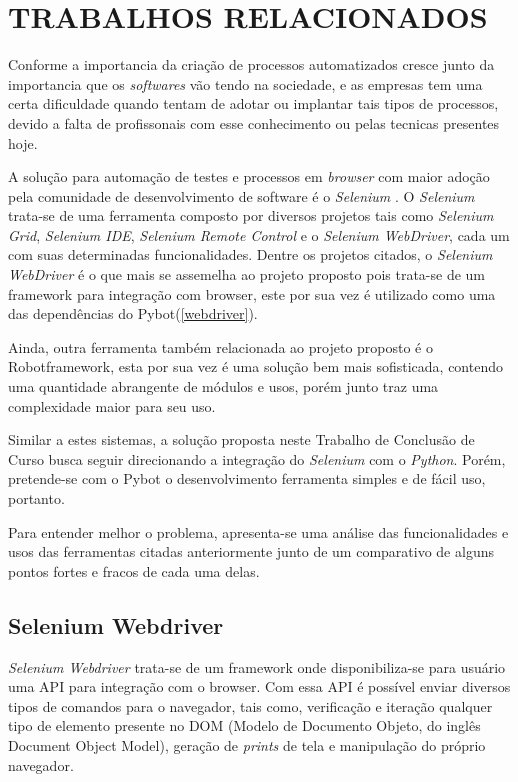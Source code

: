 %
%

\chapter{TRABALHOS RELACIONADOS}\label{chap:relacionados}

    Conforme \cite{dos2016estudo} a importancia da criação de processos automatizados cresce junto da importancia que os \emph{softwares} vão tendo na sociedade, e as empresas
    tem uma certa dificuldade quando tentam de adotar ou implantar tais tipos de processos, devido a falta de profissonais com esse conhecimento ou pelas tecnicas presentes hoje.

    A solução para automação de testes e processos em \textit{browser} com maior adoção pela comunidade de desenvolvimento de software é o \emph{Selenium} \cite{selenium}.
    O \emph{Selenium} trata-se de uma ferramenta composto por diversos projetos tais como \emph{Selenium Grid}, \emph{Selenium IDE}, \emph{Selenium Remote Control} e o \emph{Selenium WebDriver},
    cada um com suas determinadas funcionalidades. Dentre os projetos citados, o \emph{Selenium WebDriver} é o que mais se assemelha ao projeto proposto pois trata-se de um framework para
    integração com browser, este por sua vez é utilizado como uma das dependências do Pybot(\ref{webdriver}).

    Ainda, outra ferramenta também relacionada ao projeto proposto é o Robotframework, esta por sua vez é uma solução bem mais sofisticada, contendo uma quantidade abrangente de módulos
    e usos, porém junto traz uma complexidade maior para seu uso.

    Similar a estes sistemas, a solução proposta neste Trabalho de Conclusão de Curso busca seguir direcionando a integração do \emph{Selenium} com o \emph{Python}. Porém, pretende-se com o Pybot o
    desenvolvimento ferramenta simples e de fácil uso, portanto.

    Para entender melhor o problema, apresenta-se uma análise das funcionalidades e usos das ferramentas citadas anteriormente junto de um comparativo de alguns pontos fortes e
    fracos de cada uma delas.

    \section{Selenium Webdriver}

        \emph{Selenium Webdriver} \cite{webdriver} trata-se de um framework onde disponibiliza-se para usuário uma API para integração com o browser. Com essa API é possível enviar
        diversos tipos de comandos para o navegador, tais como, verificação e iteração qualquer tipo de elemento presente no DOM (Modelo de Documento Objeto, do inglês Document Object Model),
        geração de \emph{prints} de tela e manipulação do próprio navegador.

